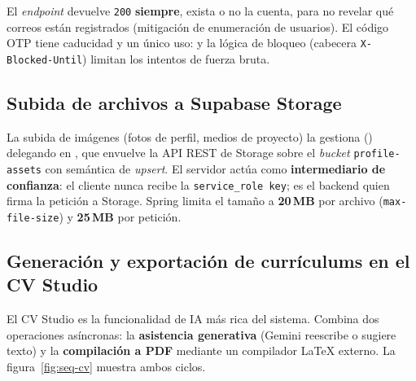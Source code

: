 \begin{AlertaSeguridad}
El \textit{endpoint}  devuelve \texttt{200} \textbf{siempre}, exista o
no la cuenta, para no revelar qué correos están registrados (mitigación de enumeración de
usuarios). El código OTP tiene caducidad y un único uso: 
y la lógica de bloqueo (cabecera \texttt{X-Blocked-Until}) limitan los intentos de fuerza
bruta.
\end{AlertaSeguridad}

\subsection{Subida de archivos a Supabase Storage}
\label{subsec:seq_upload}

La subida de imágenes (fotos de perfil, medios de proyecto) la gestiona
 () delegando en
, que envuelve la API REST de Storage sobre el \textit{bucket}
\texttt{profile-assets} con semántica de \textit{upsert}. El servidor actúa como
\textbf{intermediario de confianza}: el cliente nunca recibe la \texttt{service\_role key};
es el backend quien firma la petición a Storage. Spring limita el tamaño a \textbf{20\,MB}
por archivo (\texttt{max-file-size}) y \textbf{25\,MB} por petición.

\subsection{Generación y exportación de currículums en el CV Studio}
\label{subsec:seq_cv}

El CV Studio es la funcionalidad de IA más rica del sistema. Combina dos operaciones
asíncronas: la \textbf{asistencia generativa} (Gemini reescribe o sugiere texto) y la
\textbf{compilación a PDF} mediante un compilador LaTeX externo. La
figura~\ref{fig:seq-cv} muestra ambos ciclos.

